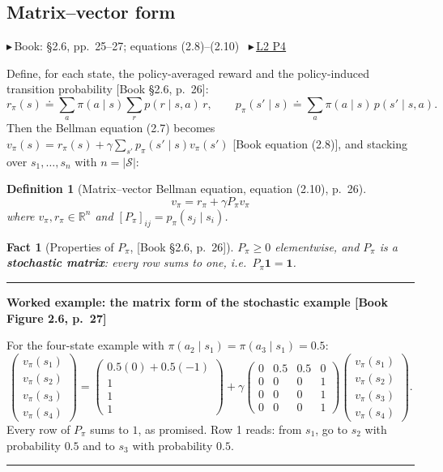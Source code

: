\documentclass[11pt, letterpaper]{article}
\theoremstyle{runin}
\newtheorem*{definition}{Definition}
\newtheorem*{fact}{Fact}
\theoremstyle{runinplain}
\theoremstyle{remark}
\newcommand{\R}{\mathbb{R}}
\newcommand{\Sspace}{\mathcal{S}}
\newcommand{\bk}[1]{{\color{bookblue}\small$\blacktriangleright$\,\textsf{Book: #1}}}
\newcommand{\bkin}[1]{{\color{bookblue}\small[\textsf{Book #1}]}}
\newcommand{\vid}[2]{{\color{vidred}\small$\playbutton$\,\href{#2}{\textsf{#1}}}}
\newcommand{\playbutton}{\blacktriangleright}
\newenvironment{worked}[1]
  {\par\medskip\noindent\rule{\textwidth}{0.4pt}\par\nobreak\vspace{0.3em}
   \noindent\textbf{Worked example: #1}\par\nobreak\vspace{0.2em}\small}
  {\par\nobreak\vspace{0.3em}\noindent\rule{\textwidth}{0.4pt}\par\medskip}
\begin{document}
\subsection{Matrix--vector form}

\bk{\S2.6, pp.~25--27; equations (2.8)--(2.10)}
\ \vid{L2 P4}{https://www.youtube.com/watch?v=EtCfBG_eP2w}

Define, for each state, the policy-averaged reward and the policy-induced
transition probability \bkin{\S2.6, p.~26}:
\[
  r_\pi(s)\doteq\sum_{a}\pi(a\mid s)\sum_{r}p(r\mid s,a)\,r,
  \qquad
  p_\pi(s'\mid s)\doteq\sum_{a}\pi(a\mid s)\,p(s'\mid s,a).
\]
Then the Bellman equation (2.7) becomes
$v_\pi(s)=r_\pi(s)+\gamma\sum_{s'}p_\pi(s'\mid s)v_\pi(s')$ \bkin{equation (2.8)},
and stacking over $s_1,\dots,s_n$ with $n=|\Sspace|$:

\begin{definition}[Matrix--vector Bellman equation, equation (2.10), p.~26]
\[
  \boxed{\;v_\pi = r_\pi + \gamma P_\pi v_\pi\;}
\]
where $v_\pi,r_\pi\in\R^n$ and $[P_\pi]_{ij}=p_\pi(s_j\mid s_i)$.
\end{definition}

\begin{fact}[Properties of $P_\pi$, \bkin{\S2.6, p.~26}]
$P_\pi\ge 0$ elementwise, and $P_\pi$ is a \textbf{stochastic matrix}: every row
sums to one, i.e.\ $P_\pi\mathbf{1}=\mathbf{1}$.
\end{fact}

\begin{worked}{the matrix form of the stochastic example \bkin{Figure 2.6, p.~27}}
For the four-state example with $\pi(a_2\mid s_1)=\pi(a_3\mid s_1)=0.5$:
\[
  \begin{pmatrix}v_\pi(s_1)\\v_\pi(s_2)\\v_\pi(s_3)\\v_\pi(s_4)\end{pmatrix}
  =\begin{pmatrix}0.5(0)+0.5(-1)\\1\\1\\1\end{pmatrix}
  +\gamma\begin{pmatrix}
    0&0.5&0.5&0\\
    0&0&0&1\\
    0&0&0&1\\
    0&0&0&1
  \end{pmatrix}
  \begin{pmatrix}v_\pi(s_1)\\v_\pi(s_2)\\v_\pi(s_3)\\v_\pi(s_4)\end{pmatrix}.
\]
Every row of $P_\pi$ sums to $1$, as promised. Row 1 reads: from $s_1$, go to $s_2$
with probability $0.5$ and to $s_3$ with probability $0.5$.
\end{worked}
\end{document}
